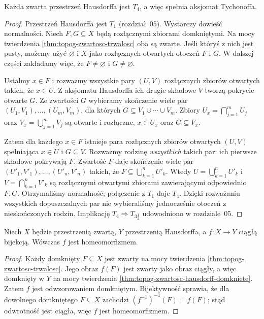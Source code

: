 \begin{twierdzenie}
\label{thm:topog-zwartosc-hausdorff-normalna}
Każda zwarta przestrzeń Hausdorffa jest $T_4$,
a więc spełnia aksjomat Tychonoffa.
\end{twierdzenie}
\begin{proof}
Przestrzeń Hausdorffa jest $T_1$ (rozdział~05).
Wystarczy dowieść normalności. Niech $F,G\subseteq X$
będą rozłącznymi zbiorami domkniętymi.
Na mocy twierdzenia \ref{thm:topog-zwartosc-trwalosc}
oba są zwarte. Jeśli któryś z nich jest pusty,
możemy użyć $\varnothing$ i $X$ jako rozłącznych
otwartych otoczeń $F$ i $G$. W dalszej części
zakładamy więc, że $F\ne\varnothing$ i $G\ne\varnothing$.

Ustalmy $x\in F$ i rozważmy wszystkie pary
$(U,V)$ rozłącznych zbiorów otwartych takich,
że $x\in U$. Z aksjomatu Hausdorffa ich drugie
składowe $V$ tworzą pokrycie otwarte $G$.
Ze zwartości $G$ wybieramy skończenie wiele par
$(U_1,V_1),\ldots,(U_m,V_m)$, dla których
$G\subseteq V_1\cup\cdots\cup V_m$.
Zbiory $U_x=\bigcap_{j=1}^m U_j$ oraz
$V_x=\bigcup_{j=1}^m V_j$ są otwarte i rozłączne,
$x\in U_x$ oraz $G\subseteq V_x$.

Zatem dla każdego $x\in F$ istnieje para
rozłącznych zbiorów otwartych $(U,V)$ spełniająca
$x\in U$ i $G\subseteq V$. Rozważmy rodzinę
\emph{wszystkich} takich par: ich pierwsze składowe
pokrywają $F$. Zwartość $F$ daje skończenie wiele
par $(U'_1,V'_1),\ldots,(U'_n,V'_n)$ takich,
że $F\subseteq\bigcup_{k=1}^n U'_k$.
Wtedy $U=\bigcup_{k=1}^n U'_k$ i
$V=\bigcap_{k=1}^n V'_k$ są rozłącznymi
otwartymi zbiorami zawierającymi odpowiednio $F,G$.
Otrzymaliśmy normalność; połączenie z $T_1$ daje $T_4$.
Dzięki rozważaniu wszystkich dopuszczalnych par
nie wybieraliśmy jednocześnie otoczeń z nieskończonych
rodzin.
Implikację $T_4\Rightarrow T_{3\frac12}$
udowodniono w rozdziale~05.
\end{proof}

\begin{wniosek}
\label{cor:topog-zwartosc-bijekcja-homeomorfizm}
Niech $X$ będzie przestrzenią zwartą, $Y$ przestrzenią
Hausdorffa, a $f\colon X\to Y$ ciągłą bijekcją.
Wówczas $f$ jest homeomorfizmem.
\end{wniosek}
\begin{proof}
Każdy domknięty $F\subseteq X$ jest zwarty na mocy
twierdzenia \ref{thm:topog-zwartosc-trwalosc}.
Jego obraz $f(F)$ jest zwarty jako obraz ciągły,
a więc domknięty w $Y$ na mocy twierdzenia
\ref{thm:topog-zwartosc-hausdorff-domkniete}.
Zatem $f$ jest odwzorowaniem domkniętym.
Bijektywność sprawia, że dla dowolnego domkniętego
$F\subseteq X$ zachodzi $(f^{-1})^{-1}(F)=f(F)$;
stąd odwrotność jest ciągła, więc $f$ jest
homeomorfizmem.
\end{proof}


